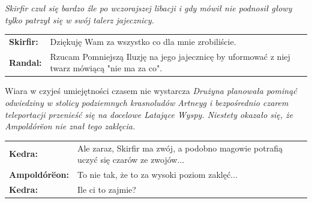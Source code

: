 \documentclass[10pt,twoside,twocolumn]{book}
\begin{document}
\begin{rpg-quotebox}{}
   \textit{Skirfir czuł się bardzo źle po wczorajszej libacji i gdy mówił nie podnosił głowy tylko patrzył się w swój talerz jajecznicy.}\\

   \begin{tabularx}{\columnwidth}{lX}
      \textbf{Skirfir:} & Dziękuję Wam za wszystko co dla mnie zrobiliście.\\
      \textbf{Randal:} & Rzucam Pomniejszą Iluzję na jego jajecznicę by uformować z niej twarz mówiącą "nie ma za co".\\
   \end{tabularx}
\end{rpg-quotebox}


\begin{rpg-quotebox}{Wiara w czyjeś umiejętności czasem nie wystarcza}
   \textit{Drużyna planowała pominąć odwiedziny w stolicy podziemnych krasnoludów Artneyg i bezpośrednio czarem teleportacji przenieść się na docelowe Latające Wyspy. Niestety okazało się, że Ampoldórëon nie znał tego zaklęcia.}\\

   \begin{tabularx}{\columnwidth}{lX}
      \textbf{Kedra:} & Ale zaraz, Skirfir ma zwój, a podobno magowie potrafią uczyć się czarów ze zwojów...\\
      \textbf{Ampoldórëon:} & To nie tak, że to za wysoki poziom zaklęć...\\
      \textbf{Kedra:} & Ile ci to zajmie?\\
   \end{tabularx}
\end{rpg-quotebox}
\end{document}

